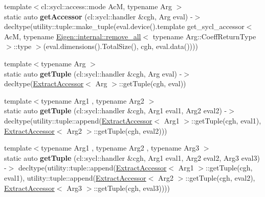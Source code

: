\begin{DoxyCompactItemize}
\item 
\mbox{\label{struct_eigen_1_1_tensor_sycl_1_1internal_1_1_accessor_constructor_a7f94ccf32448b107bd46bd2dfc40f2bc}} 
{\footnotesize template$<$cl\+::sycl\+::access\+::mode AcM, typename Arg $>$ }\\static auto {\bfseries get\+Accessor} (cl\+::sycl\+::handler \&cgh, Arg eval) -\/$>$ decltype(utility\+::tuple\+::make\+\_\+tuple(eval.\+device().template get\+\_\+sycl\+\_\+accessor$<$ AcM, typename \hyperlink{struct_eigen_1_1internal_1_1remove__all}{Eigen\+::internal\+::remove\+\_\+all}$<$ typename Arg\+::\+Coeff\+Return\+Type $>$\+::type $>$(eval.\+dimensions().Total\+Size(), cgh, eval.\+data())))
\item 
\mbox{\label{struct_eigen_1_1_tensor_sycl_1_1internal_1_1_accessor_constructor_a7afcb4b214e2371f61cdeb81eda14e5a}} 
{\footnotesize template$<$typename Arg $>$ }\\static auto {\bfseries get\+Tuple} (cl\+::sycl\+::handler \&cgh, Arg eval) -\/$>$ decltype(\hyperlink{struct_eigen_1_1_tensor_sycl_1_1internal_1_1_extract_accessor}{Extract\+Accessor}$<$ Arg $>$\+::get\+Tuple(cgh, eval))
\item 
\mbox{\label{struct_eigen_1_1_tensor_sycl_1_1internal_1_1_accessor_constructor_a143c5607532668fb8ad51139ef814af2}} 
{\footnotesize template$<$typename Arg1 , typename Arg2 $>$ }\\static auto {\bfseries get\+Tuple} (cl\+::sycl\+::handler \&cgh, Arg1 eval1, Arg2 eval2) -\/$>$ decltype(utility\+::tuple\+::append(\hyperlink{struct_eigen_1_1_tensor_sycl_1_1internal_1_1_extract_accessor}{Extract\+Accessor}$<$ Arg1 $>$\+::get\+Tuple(cgh, eval1), \hyperlink{struct_eigen_1_1_tensor_sycl_1_1internal_1_1_extract_accessor}{Extract\+Accessor}$<$ Arg2 $>$\+::get\+Tuple(cgh, eval2)))
\item 
\mbox{\label{struct_eigen_1_1_tensor_sycl_1_1internal_1_1_accessor_constructor_ad3fdd38122365383400b4ac68fb9c8ee}} 
{\footnotesize template$<$typename Arg1 , typename Arg2 , typename Arg3 $>$ }\\static auto {\bfseries get\+Tuple} (cl\+::sycl\+::handler \&cgh, Arg1 eval1, Arg2 eval2, Arg3 eval3) -\/$>$ decltype(utility\+::tuple\+::append(\hyperlink{struct_eigen_1_1_tensor_sycl_1_1internal_1_1_extract_accessor}{Extract\+Accessor}$<$ Arg1 $>$\+::get\+Tuple(cgh, eval1), utility\+::tuple\+::append(\hyperlink{struct_eigen_1_1_tensor_sycl_1_1internal_1_1_extract_accessor}{Extract\+Accessor}$<$ Arg2 $>$\+::get\+Tuple(cgh, eval2), \hyperlink{struct_eigen_1_1_tensor_sycl_1_1internal_1_1_extract_accessor}{Extract\+Accessor}$<$ Arg3 $>$\+::get\+Tuple(cgh, eval3))))

\end{DoxyCompactItemize}
